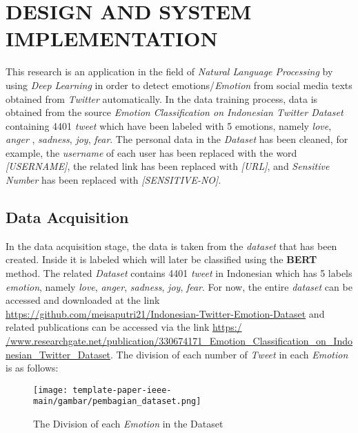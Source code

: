 \section{DESIGN AND SYSTEM IMPLEMENTATION}
\label{sec:desainimplementasi}

This research is an application in the field of \textit{Natural Language Processing} by using \textit{Deep Learning} in order to detect emotions/\textit{Emotion} from social media texts obtained from \textit{Twitter} automatically. In the data training process, data is obtained from the source \textit{Emotion Classification on Indonesian Twitter Dataset} \cite{dataset} containing 4401 \textit{tweet} which have been labeled with 5 emotions, namely \textit{love}, \textit{anger }, \textit{sadness}, \textit{joy}, \textit{fear}. The personal data in the \textit{Dataset} has been cleaned, for example, the \textit{username} of each user has been replaced with the word \textit{[USERNAME]}, the related link has been replaced with \textit{[URL]}, and \textit{Sensitive Number} has been replaced with \textit{[SENSITIVE-NO]}.

\subsection{Data Acquisition}

In the data acquisition stage, the data is taken from the \textit{dataset} that has been created. Inside it is labeled which will later be classified using the \textbf{BERT} method. The related \textit{Dataset} contains 4401 \textit{tweet} in Indonesian which has 5 labels \textit{emotion}, namely \textit{love}, \textit{anger}, \textit{sadness}, \textit {joy}, \textit{fear}. For now, the entire \textit{dataset} can be accessed and downloaded at the link \url{https://github.com/meisaputri21/Indonesian-Twitter-Emotion-Dataset} and related publications can be accessed via the link \url{https:/ /www.researchgate.net/publication/330674171_Emotion_Classification_on_Indonesian_Twitter_Dataset}. The division of each number of \textit{Tweet} in each \textit{Emotion} is as follows:

\begin{figure}[h!]
  \begin{center}
    \texttt{[image: template-paper-ieee-main/gambar/pembagian\_dataset.png]}
    \caption{The Division of each \textit{Emotion} in the Dataset}
    \label{fig: dataset}
  \end{center}
\end{figure}

